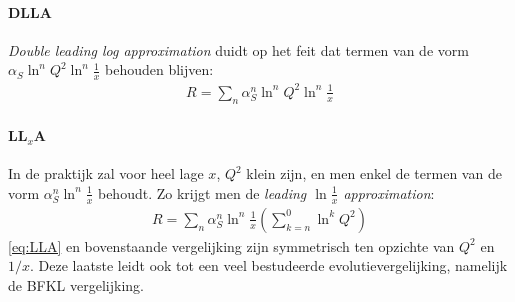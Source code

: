 \documentclass[a4paper,11pt]{article}
\numberwithin{equation}{section} %
\begin{document}
      \paragraph{DLLA}
\textit{Double leading log approximation} duidt op het feit dat termen van de vorm $\alpha_S \ln^n{Q^2} \ln^n{\frac{1}{x}}$ behouden blijven:
\begin{align}
R = \sum_n \alpha_S^n \ln^n{Q^2} \ln^n{\frac{1}{x}}
\end{align}

      \paragraph{LL$_x$A}
In de praktijk zal voor heel lage $x$, $Q^2$ klein zijn, en men enkel de termen van de vorm $\alpha_S^n \ln^n{\frac{1}{x}}$ behoudt. Zo krijgt men de \textit{leading $\ln{\frac{1}{x}}$ approximation}:
\begin{align}
R = \sum_n \alpha_S^n \ln^n{\frac{1}{x}} \left( \sum_{k=n}^0 \ln^k{Q^2} \right)
\end{align}
\eqref{eq:LLA} en bovenstaande vergelijking zijn symmetrisch ten opzichte van $Q^2$ en $1/x$. Deze laatste leidt ook tot een veel bestudeerde evolutievergelijking, namelijk de BFKL vergelijking.
\end{document}
